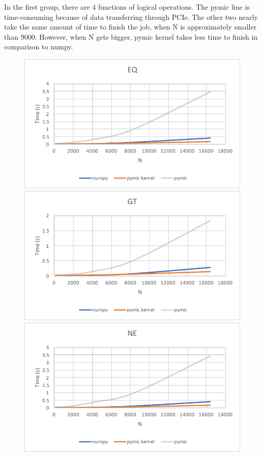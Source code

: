 In the first group, there are 4 functions of logical operations. The pymic line is time-consuming because of data transferring through PCIe. The other two nearly take the same amount of time to finish the job, when N is approximately smaller than 9000. However, when N gets bigger, pymic kernel takes less time to finish in comparison to numpy.
\begin{figure}[]
\includegraphics[scale=0.5]{img/group1/eq.pdf}
\includegraphics[scale=0.5]{img/group1/gt.pdf}
\includegraphics[scale=0.5]{img/group1/ne.pdf}

\end{figure}
